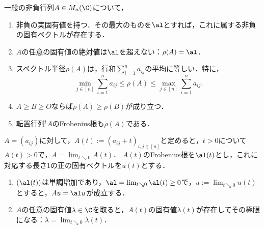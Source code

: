 \documentclass[uplatex, dvipdfmx]{jsreport}
\begin{document}
\begin{theorem}[非負行列のFrobenius根]
    一般の非負行列$A\in M_n(\C)$について，
    \begin{enumerate}
        \item 非負の実固有値を持つ．その最大のものを$\al$とすれば，これに属する非負の固有ベクトルが存在する．
        \item $A$の任意の固有値の絶対値は$\al$を超えない：$\rho(A)=\al$．
        \item スペクトル半径$\rho(A)$は，行和$\sum_{i=1}^na_{ij}$の平均に等しい．特に，
        \[\min_{j\in[n]}\sum_{i=1}^na_{ij}\le\rho(A)\le\max_{j\in[n]}\sum_{i=1}^na_{ij}.\]
        \item $A\ge B\ge O$ならば$\rho(A)\ge\rho(B)$が成り立つ．
        \item 転置行列${}^t\!A$のFrobenius根も$\rho(A)$である．
    \end{enumerate}
\end{theorem}
\begin{Proof}
    $A=(a_{ij})$に対して，$A(t):=(a_{ij}+t)_{i,j\in[n]}$と定めると，$t>0$について$A(t)>0$で，$A=\lim_{t\searrow0}A(t)$．
    $A(t)$のFrobenius根を$\al(t)$とし，これに対応する長さ$1$の正の固有ベクトルを$u(t)$とする．
    \begin{enumerate}
        \item $(\al(t))$は単調増加であり，$\al=\lim_{t\searrow0}\al(t)\ge0$で，$u:=\lim_{t\searrow0}u(t)$とすると，$Au=\al u$が成立する．
        \item $A$の任意の固有値$\lambda\in\C$を取ると，$A(t)$の固有値$\lambda(t)$が存在してその極限になる：$\lambda=\lim_{t\searrow0}\lambda(t)$．
    \end{enumerate}
\end{Proof}
\end{document}
